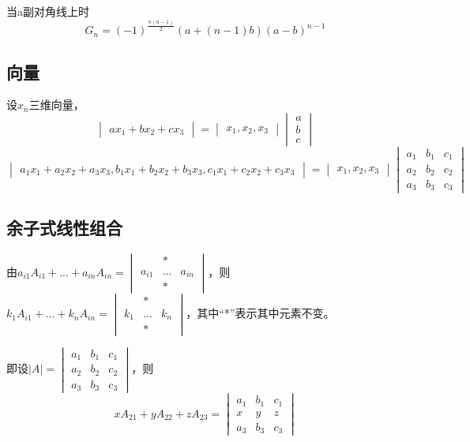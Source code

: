 当a副对角线上时
\[G_n = (-1)^{\frac{n(n - 1)}{2}}(a + (n - 1)b)(a - b)^{n - 1}\]


\subsection{向量}

设\(x_n\)三维向量，
\[\begin{vmatrix}
a x_1 + b x_2 + c x_3
\end{vmatrix} = 
\begin{vmatrix}
x_1, x_2, x_3
\end{vmatrix}
\begin{vmatrix}
a \\ 
b \\ 
c
\end{vmatrix}\]
\[\begin{vmatrix}
a_1 x_1 + a_2 x_2 + a_3 x_3, b_1 x_1 + b_2 x_2 + b_3 x_3, c_1 x_1 + c_2 x_2 + c_3 x_3
\end{vmatrix} = 
\begin{vmatrix}
x_1, x_2, x_3
\end{vmatrix}
\begin{vmatrix}
a_1 & b_1 & c_1 \\ 
a_2 & b_2 & c_2 \\ 
a_3 & b_3 & c_3
\end{vmatrix}\]


\subsection{余子式线性组合}

由\(a_{i1}A_{i1} + ... + a_{in}A_{in} = \begin{vmatrix}
     & * & \\ 
    a_{i1} & ... & a_{in} \\ 
     & * & 
\end{vmatrix}\)，则\(k_{1}A_{i1} + ... + k_{n}A_{in} = 
\begin{vmatrix}
     & * & \\ 
    k_{1} & ... & k_{n} \\ 
     & * & 
\end{vmatrix}\)，其中“*”表示其中元素不变。

即设\(|A| = \begin{vmatrix}
    a_1 & b_1 & c_1 \\ 
    a_2 & b_2 & c_2 \\ 
    a_3 & b_3 & c_3
\end{vmatrix}\)，则\[xA_{21} + yA_{22} + zA_{23} = \begin{vmatrix}
    a_1 & b_1 & c_1 \\ 
    x & y & z \\ 
    a_3 & b_3 & c_3
\end{vmatrix}\]



